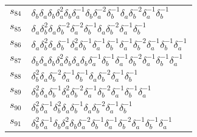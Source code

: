 \documentclass{article}
\begin{document}
\begin{center}
\begin{tabular}{ll}
$s_{84}$ & $\delta_b^{}\delta_a^{}\delta_b^{}\delta_a^{2}\delta_b^{}\delta_a^{-1}\delta_b^{}\delta_a^{-2}\delta_b^{-1}\delta_a^{}\delta_b^{-2}\delta_a^{-1}\delta_b^{-1}$ \\
$s_{85}$ & $\delta_a^{}\delta_b^{2}\delta_a^{}\delta_b^{-2}\delta_a^{-2}\delta_b^{-1}\delta_a^{}\delta_b^{-2}\delta_a^{-1}\delta_b^{-1}$ \\
$s_{86}$ & $\delta_a^{}\delta_b^{2}\delta_a^{}\delta_b^{-1}\delta_a^{2}\delta_b^{-1}\delta_a^{-1}\delta_b^{-1}\delta_a^{-1}\delta_b^{-2}\delta_a^{-1}\delta_b^{-1}\delta_a^{-1}$ \\
$s_{87}$ & $\delta_b^{}\delta_a^{}\delta_b^{}\delta_a^{2}\delta_b^{}\delta_a^{}\delta_b^{}\delta_a^{-1}\delta_b^{-1}\delta_a^{-1}\delta_b^{-2}\delta_a^{-1}\delta_b^{-1}\delta_a^{-1}$ \\
$s_{88}$ & $\delta_b^{2}\delta_a^{}\delta_b^{-2}\delta_a^{-1}\delta_b^{-1}\delta_a^{}\delta_b^{-2}\delta_a^{-1}\delta_b^{-1}$ \\
$s_{89}$ & $\delta_b^{2}\delta_a^{}\delta_b^{-1}\delta_a^{2}\delta_b^{-2}\delta_a^{-1}\delta_b^{-2}\delta_a^{-1}\delta_b^{-1}\delta_a^{-1}$ \\
$s_{90}$ & $\delta_b^{2}\delta_a^{-1}\delta_b^{2}\delta_a^{}\delta_b^{-1}\delta_a^{}\delta_b^{-2}\delta_a^{-1}\delta_b^{-1}$ \\
$s_{91}$ & $\delta_b^{2}\delta_a^{-1}\delta_b^{}\delta_a^{2}\delta_b^{}\delta_a^{-2}\delta_b^{-1}\delta_a^{-1}\delta_b^{-2}\delta_a^{-1}\delta_b^{-1}\delta_a^{-1}$ \\
\bottomrule
\end{tabular}
\end{center}

\thispagestyle{empty}
\end{document}
